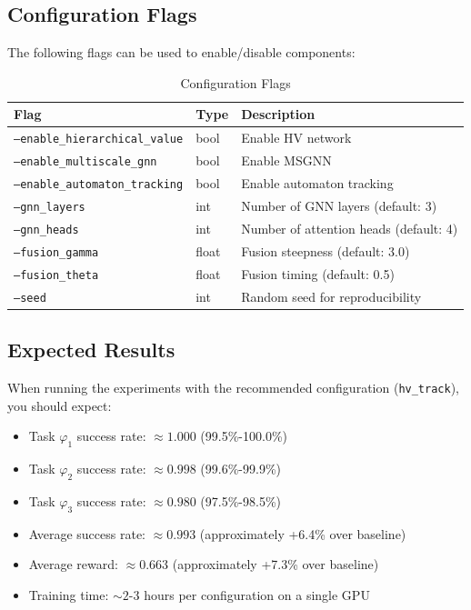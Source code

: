 \documentclass[conference]{IEEEtran}
\begin{document}
\subsection{Configuration Flags}

The following flags can be used to enable/disable components:

\begin{table}[h]
\centering
\caption{Configuration Flags}
\begin{tabular}{@{}lll@{}}
\toprule
\textbf{Flag} & \textbf{Type} & \textbf{Description} \\ \midrule
\texttt{--enable\_hierarchical\_value} & bool & Enable HV network \\
\texttt{--enable\_multiscale\_gnn} & bool & Enable MSGNN \\
\texttt{--enable\_automaton\_tracking} & bool & Enable automaton tracking \\
\texttt{--gnn\_layers} & int & Number of GNN layers (default: 3) \\
\texttt{--gnn\_heads} & int & Number of attention heads (default: 4) \\
\texttt{--fusion\_gamma} & float & Fusion steepness (default: 3.0) \\
\texttt{--fusion\_theta} & float & Fusion timing (default: 0.5) \\
\texttt{--seed} & int & Random seed for reproducibility \\
\bottomrule
\end{tabular}
\end{table}

\subsection{Expected Results}

When running the experiments with the recommended configuration (\texttt{hv\_track}), you should expect:

\begin{itemize}
    \item Task $\varphi_1$ success rate: $\approx 1.000$ (99.5\%-100.0\%)
    \item Task $\varphi_2$ success rate: $\approx 0.998$ (99.6\%-99.9\%)
    \item Task $\varphi_3$ success rate: $\approx 0.980$ (97.5\%-98.5\%)
    \item Average success rate: $\approx 0.993$ (approximately +6.4\% over baseline)
    \item Average reward: $\approx 0.663$ (approximately +7.3\% over baseline)
    \item Training time: $\sim 2$-$3$ hours per configuration on a single GPU
\end{itemize}
\end{document}
